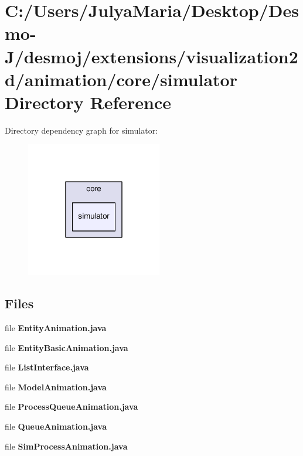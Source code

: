\section{C\-:/\-Users/\-Julya\-Maria/\-Desktop/\-Desmo-\/\-J/desmoj/extensions/visualization2d/animation/core/simulator Directory Reference}
\label{dir_8e996999ffcd1459c5c7eaf9bfddf11c}
Directory dependency graph for simulator\-:
\nopagebreak
\begin{figure}[H]
\begin{center}
\leavevmode
\includegraphics[width=168pt]{dir_8e996999ffcd1459c5c7eaf9bfddf11c_dep}
\end{center}
\end{figure}
\subsection*{Files}
\begin{DoxyCompactItemize}
\item 
file {\bfseries Entity\-Animation.\-java}
\item 
file {\bfseries Entity\-Basic\-Animation.\-java}
\item 
file {\bfseries List\-Interface.\-java}
\item 
file {\bfseries Model\-Animation.\-java}
\item 
file {\bfseries Process\-Queue\-Animation.\-java}
\item 
file {\bfseries Queue\-Animation.\-java}
\item 
file {\bfseries Sim\-Process\-Animation.\-java}
\end{DoxyCompactItemize}
